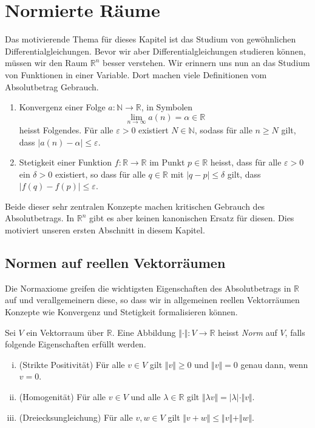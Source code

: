 \documentclass[../main.tex]{subfiles}
\begin{document}
\chapter{Normierte Räume}\label{chp:normed-spaces}
Das motivierende Thema für dieses Kapitel
ist das Studium von gewöhnlichen Differentialgleichungen.
Bevor wir aber Differentialgleichungen studieren können,
müssen wir den Raum $\mathbb{R}^n$ besser verstehen.
Wir erinnern uns nun an das Studium von Funktionen
in einer Variable.
Dort machen viele Definitionen
vom Absolutbetrag Gebrauch.

\begin{examples}
  \leavevmode
  \begin{enumerate}[(1)]
    \item Konvergenz einer Folge $a \colon \mathbb{N} \to \mathbb{R}$,
      in Symbolen
      \[
        \lim_{n \to \infty} a(n) = \alpha \in \mathbb{R}
      \]
      heisst Folgendes. Für alle $\varepsilon > 0$ existiert
      $N \in \mathbb{N}$, sodass für alle $n \geq N$
      gilt, dass $|a(n) - \alpha| \leq \varepsilon$.
    \item Stetigkeit einer Funktion $f \colon \mathbb{R} \to \mathbb{R}$
      im Punkt $p\in \mathbb{R}$ heisst, dass für alle $\varepsilon > 0$
      ein $\delta > 0$ existiert, so dass
      für alle $q \in \mathbb{R}$ mit $|q - p| \leq \delta$ gilt,
      dass $|f(q) - f(p)| \leq \varepsilon$.
  \end{enumerate}
\end{examples}

Beide dieser sehr zentralen Konzepte machen kritischen Gebrauch
des Absolutbetrags.
In $\mathbb{R}^n$ gibt es aber keinen kanonischen Ersatz für diesen.
Dies motiviert unseren ersten Abschnitt in diesem Kapitel.

\section{Normen auf reellen Vektorräumen}
Die Normaxiome greifen die wichtigsten Eigenschaften des
Absolutbetrags in $\mathbb{R}$ auf und verallgemeinern
diese, so dass wir in allgemeinen reellen Vektorräumen
Konzepte wie Konvergenz und Stetigkeit formalisieren können.

\begin{definition}
  Sei $V$ ein Vektorraum über $\mathbb{R}$.
  Eine Abbildung $\Vert \cdot \Vert \colon V \to \mathbb{R}$
  heisst \emph{Norm} auf $V$, falls folgende Eigenschaften erfüllt werden.
  \begin{enumerate}[(i)]
    \item (Strikte Positivität)
      Für alle $v \in V$ gilt $\Vert v \Vert \geq 0$ und
      $\Vert v \Vert = 0$ genau dann, wenn $v = 0$.
    \item (Homogenität)
      Für alle $v \in V$ und alle $\lambda \in \mathbb{R}$ gilt
      $\Vert \lambda v \Vert = |\lambda| \cdot \Vert v \Vert$.
    \item (Dreiecksungleichung)
      Für alle $v, w \in V$ gilt $\Vert v + w \Vert \leq \Vert v \Vert
      + \Vert w \Vert$.
  \end{enumerate}
\end{definition}
\end{document}
